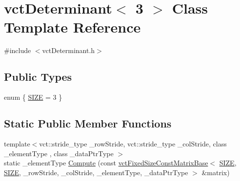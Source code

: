 \hypertarget{classvct_determinant_3_013_01_4}{\section{vct\-Determinant$<$ 3 $>$ Class Template Reference}
\label{classvct_determinant_3_013_01_4}
}


{\ttfamily \#include $<$vct\-Determinant.\-h$>$}

\subsection*{Public Types}
\begin{DoxyCompactItemize}
\item 
enum \{ \hyperlink{classvct_determinant_3_013_01_4_a964ab489f1d49147a28785b1855baaaeae80921081f11f0f0611adf3a93f0c07a}{S\-I\-Z\-E} = 3
 \}
\end{DoxyCompactItemize}
\subsection*{Static Public Member Functions}
\begin{DoxyCompactItemize}
\item 
{\footnotesize template$<$vct\-::stride\-\_\-type \-\_\-row\-Stride, vct\-::stride\-\_\-type \-\_\-col\-Stride, class \-\_\-element\-Type , class \-\_\-data\-Ptr\-Type $>$ }\\static \-\_\-element\-Type \hyperlink{classvct_determinant_3_013_01_4_a01cb97fb0a93af7ec91244b3a13a6ae2}{Compute} (const \hyperlink{classvct_fixed_size_const_matrix_base}{vct\-Fixed\-Size\-Const\-Matrix\-Base}$<$ \hyperlink{classvct_determinant_3_013_01_4_a964ab489f1d49147a28785b1855baaaeae80921081f11f0f0611adf3a93f0c07a}{S\-I\-Z\-E}, \hyperlink{classvct_determinant_3_013_01_4_a964ab489f1d49147a28785b1855baaaeae80921081f11f0f0611adf3a93f0c07a}{S\-I\-Z\-E}, \-\_\-row\-Stride, \-\_\-col\-Stride, \-\_\-element\-Type, \-\_\-data\-Ptr\-Type $>$ \&matrix)
\end{DoxyCompactItemize}



